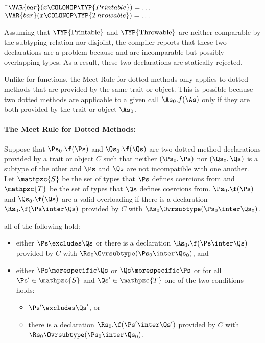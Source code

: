 \begin{Fortress}
{\tt~}\pushtabs\=\+\( \VAR{bar}(x\COLONOP\TYP{Printable}) = \ldots\)\\
\( \VAR{bar}(x\COLONOP\TYP{Throwable}) = \ldots\)\-\\\poptabs
\end{Fortress}

Assuming that $\hbox{\TYP{Printable}}$ and $\hbox{\TYP{Throwable}}$
are neither comparable by the subtyping relation nor disjoint, the
compiler reports that these two declarations are a problem because
 and  are incomparable but possibly
overlapping types.
As a result, these two declarations are statically rejected.

Unlike for functions, the Meet Rule for dotted methods only applies to
dotted methods that are provided by the same trait or object.  This is
possible because two dotted methods are applicable to a given call
$\As_0.f(\As)$ only if they are both provided by the trait or object
$\As_0$.

\paragraph{The Meet Rule for Dotted Methods:}
Suppose that $\Ps_0.\f(\Ps)$ and $\Qs_0.\f(\Qs)$ are two dotted method
declarations provided by a trait or object $C$ such that neither
$(\Ps_0, \Ps)$ nor $(\Qs_0, \Qs)$ is a subtype of the other and $\Ps$
and $\Qs$ are not incompatible with one another.
Let $\mathpzc{S}$ be the set of
types that $\Ps$ defines coercions from and $\mathpzc{T}$ be the set
of types that $\Qs$ defines coercions from.
$\Ps_0.\f(\Ps)$ and
$\Qs_0.\f(\Qs)$ are a valid overloading if
there is a declaration $\Rs_0.\f(\Ps
\inter \Qs)$ provided by $C$ with $\Rs_0 \Ovrsubtype (\Ps_0 \inter
\Qs_0)$.

all of the following hold:
\begin{itemize}
\item
either $\Ps \excludes \Qs$ or there is a declaration $\Rs_0.\f(\Ps
\inter \Qs)$ provided by $C$ with $\Rs_0 \Ovrsubtype (\Ps_0 \inter
\Qs_0)$, and
\item
either $\Ps \morespecific \Qs$ or $\Qs \morespecific \Ps$ or
for all $\Ps' \in \mathpzc{S}$ and
$\Qs' \in \mathpzc{T}$ one of the two conditions holds:
\begin{itemize}
\item
$\Ps' \excludes \Qs'$, or
\item
there is a declaration $\Rs_0.\f(\Ps' \inter \Qs')$ provided by $C$
with $\Rs_0 \Ovrsubtype (\Ps_0 \inter \Qs_0)$.
\end{itemize}
\end{itemize}

